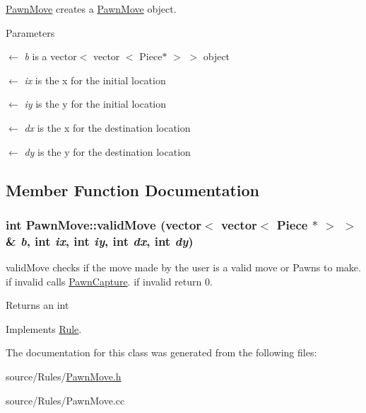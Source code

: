 \hyperlink{classPawnMove}{PawnMove} creates a \hyperlink{classPawnMove}{PawnMove} object. 
\begin{DoxyParams}{Parameters}
\item[\mbox{$\leftarrow$} {\em b}]is a vector$<$ vector $<$ Piece$\ast$ $>$ $>$ object \item[\mbox{$\leftarrow$} {\em ix}]is the x for the initial location \item[\mbox{$\leftarrow$} {\em iy}]is the y for the initial location \item[\mbox{$\leftarrow$} {\em dx}]is the x for the destination location \item[\mbox{$\leftarrow$} {\em dy}]is the y for the destination location \end{DoxyParams}


\subsection{Member Function Documentation}
\hypertarget{classPawnMove_a9280b4befe12bc9439d60ad7765187af}{
\subsubsection[{validMove}]{\setlength{\rightskip}{0pt plus 5cm}int PawnMove::validMove (vector$<$ vector$<$ {\bf Piece} $\ast$ $>$ $>$ \& {\em b}, \/  int {\em ix}, \/  int {\em iy}, \/  int {\em dx}, \/  int {\em dy})}}
\label{classPawnMove_a9280b4befe12bc9439d60ad7765187af}


validMove checks if the move made by the user is a valid move or Pawns to make. if invalid calls \hyperlink{classPawnCapture}{PawnCapture}. if invalid return 0. \begin{DoxyReturn}{Returns}
an int 
\end{DoxyReturn}


Implements \hyperlink{classRule}{Rule}.

The documentation for this class was generated from the following files:\begin{DoxyCompactItemize}
\item 
source/Rules/\hyperlink{PawnMove_8h}{PawnMove.h}\item 
source/Rules/PawnMove.cc\end{DoxyCompactItemize}
